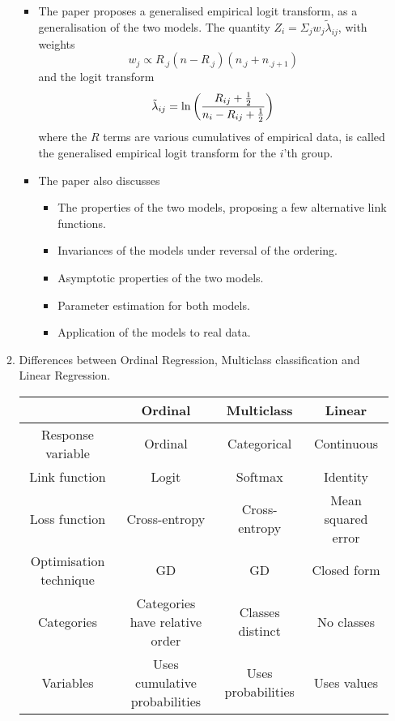 \documentclass[reqno]{amsart}
\begin{document}
\begin{enumerate}[label=\textbf{(\Roman*)}]
\begin{enumerate}[label=\textbf{(\alph*)}]
\begin{itemize}
                \item The paper proposes a generalised empirical logit transform, as a generalisation of the two models. The quantity \(Z_{i} = \Sigma_j w_j \tilde{\lambda}_{ij}\), with 
                weights
                \[w_j \propto R_{.j}(n - R_{.j})(n_{.j} + n_{.j+1})\]
                and the logit transform
                \[\tilde{\lambda}_{ij} = \ln \left(\frac{R_{ij} + \frac{1}{2}}{n_i - R_{ij} + \frac{1}{2}}\right)\]
                where the \(R\) terms are various cumulatives of empirical data, is called the generalised empirical logit transform for the \(i\)'th group.
                
                \item The paper also discusses \begin{itemize}
                    \item The properties of the two models, proposing a few alternative link functions.
                    \item Invariances of the models under reversal of the ordering.
                    \item Asymptotic properties of the two models.
                    \item Parameter estimation for both models.
                    \item Application of the models to real data.
                \end{itemize} 
            \end{itemize}
            \item Differences between Ordinal Regression, Multiclass classification and Linear Regression.
    
           \begin{center}
             \begin{tabular}{|c|c|c|c|}
                \hline
                &Ordinal & Multiclass & Linear \\
                \hline
                Response variable & Ordinal & Categorical & Continuous \\
                Link function & Logit & Softmax & Identity \\
                Loss function & Cross-entropy & Cross-entropy & Mean squared error \\
                Optimisation technique & GD & GD & Closed form \\
                Categories & Categories have relative order & Classes distinct & No classes \\
                Variables & Uses cumulative probabilities & Uses probabilities & Uses values \\
                \hline
             \end{tabular}
           \end{center}
    

\end{enumerate}
\end{enumerate}
\end{document}
